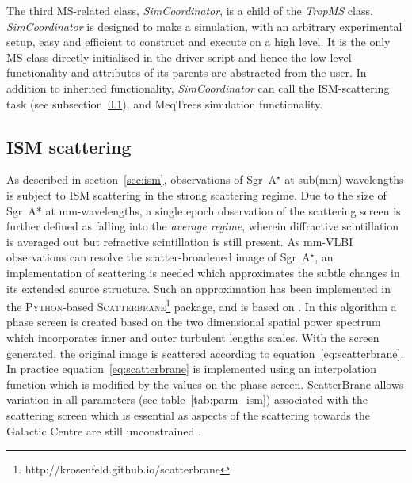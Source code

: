 The third MS-related class, \emph{SimCoordinator}, is a child of the {\it TropMS} class. {\it SimCoordinator} is designed to make a simulation, with an arbitrary experimental setup, easy and efficient to construct and execute on a high level. It is the only MS class directly initialised in the driver script and hence the low level functionality and attributes of its parents are abstracted from the user. In addition to inherited functionality, {\it SimCoordinator} can call the ISM-scattering task (see subsection~\ref{sec:ism_imp}), and {\sc MeqTrees} simulation functionality.
 

\subsection{ISM scattering}\label{sec:ism_imp}

As described in section~\ref{sec:ism}, observations of Sgr~A$^\star$ at sub(mm) wavelengths is subject to ISM scattering in the strong scattering regime. Due to the size of Sgr~A* at mm-wavelengths, a single epoch observation of the scattering screen is further defined as falling into the \emph{average regime}, wherein diffractive scintillation is averaged out but refractive scintillation is still present. As mm-VLBI observations can resolve the scatter-broadened image of Sgr~A$^\star$, an implementation of scattering is needed which approximates the subtle changes in its extended source structure. Such an approximation has been implemented in the \textsc{Python}-based \textsc{Scatterbrane}\footnote{http://krosenfeld.github.io/scatterbrane} package, and is based on \citet*{Johnson_2015a}. In this algorithm a phase screen is created based on the two dimensional spatial power spectrum  \citep*[see][Appendix C]{Johnson_2015a} which incorporates inner and outer turbulent lengths scales. With the screen generated, the original image is scattered according to equation~\ref{eq:scatterbrane}. In practice equation~\ref{eq:scatterbrane} is implemented using an interpolation function which is modified by the values on the phase screen. {\sc ScatterBrane} allows variation in all parameters (see table~\ref{tab:parm_ism}) associated with the scattering screen which is essential as aspects of the scattering towards the Galactic Centre are still unconstrained \citep[e.g.][]{Gwinn_2014}.

